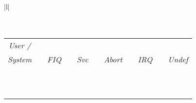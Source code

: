 \begin{tabular}{|l|}
\hline
\\
\\
\\
\ttfamily
\small
\begin{tabular}[b]{|l|c|l|c|l|c|l|c|l|c|l|}
	\multicolumn{1}{c}{\emph{User /}} \\
	\multicolumn{1}{c}{\emph{System}} & \multicolumn{1}{c}{} & \multicolumn{1}{c}{\emph{FIQ}} & \multicolumn{1}{c}{} & \multicolumn{1}{c}{\emph{Svc}} & \multicolumn{1}{c}{} & \multicolumn{1}{c}{\emph{Abort}} & \multicolumn{1}{c}{} & \multicolumn{1}{c}{\emph{IRQ}} & \multicolumn{1}{c}{} &\multicolumn{1}{c}{\emph{Undef}} \\
	\hhline{-*{5}{~-}}
	\register{R0} & & \register{R0} & & \register{R0} & & \register{R0} & & \register{R0} & & \register{R0}\\
	\hhline{-*{5}{~-}}
	\register{R1} & & \register{R1} & & \register{R1} & & \register{R1} & & \register{R1} & & \register{R1}\\
	\hhline{-*{5}{~-}}
	\register{R2} & & \register{R2} & & \register{R2} & & \register{R2} & & \register{R2} & & \register{R2}\\
	\hhline{-*{5}{~-}}
	\register{R3} & & \register{R3} & & \register{R3} & & \register{R3} & & \register{R3} & & \register{R3}\\
	\hhline{-*{5}{~-}}
	\register{R4} & & \register{R4} & & \register{R4} & & \register{R4} & & \register{R4} & & \register{R4}\\
	\hhline{-*{5}{~-}}
	\register{R5} & & \register{R5} & & \register{R5} & & \register{R5} & & \register{R5} & & \register{R5}\\
	\hhline{-*{5}{~-}}
	\register{R6} & & \register{R6} & & \register{R6} & & \register{R6} & & \register{R6} & & \register{R6}\\
	\hhline{-*{5}{~-}}
	\register{R7} & & \register{R7} & & \register{R7} & & \register{R7} & & \register{R7} & & \register{R7}\\
	\hhline{-*{5}{~-}}
	\register{R8} & & \cellcolor{gray!25}\register{R8\_fiq} & & \register{R8} & & \register{R8} & & \register{R8} & & \register{R8}\\
	\hhline{-*{5}{~-}}
	\register{R9} & & \cellcolor{gray!25}\register{R9\_fiq} & & \register{R9} & & \register{R9} & & \register{R9} & & \register{R9}\\
	\hhline{-*{5}{~-}}
	\register{R10} & & \cellcolor{gray!25}\register{R10\_fiq} & & \register{R10} & & \register{R10} & & \register{R10} & & \register{R10}\\

\end{tabular}
\end{tabular}
